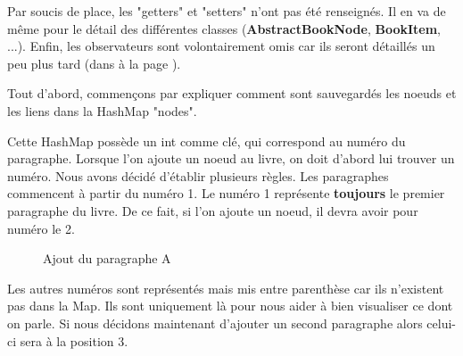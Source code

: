 			Par soucis de place, les "getters" et "setters" n'ont pas été renseignés. Il en va de même pour le détail des différentes classes (\textbf{AbstractBookNode}, \textbf{BookItem}, ...). Enfin, les observateurs sont volontairement omis car ils seront détaillés un peu plus tard (dans  à la page \pageref{subsec:pattern_observer}).

			Tout d'abord, commençons par expliquer comment sont sauvegardés les noeuds et les liens dans la HashMap "nodes".

			Cette HashMap possède un int comme clé, qui correspond au numéro du paragraphe. Lorsque l'on ajoute un noeud au livre, on doit d'abord lui trouver un numéro. Nous avons décidé d'établir plusieurs règles. Les paragraphes commencent à partir du numéro 1. Le numéro 1 représente \textbf{toujours} le premier paragraphe du livre. De ce fait, si l'on ajoute un noeud, il devra avoir pour numéro le 2.

			\begin{figure}[H]
				\begin{center}
				\end{center}
				\caption{Ajout du paragraphe A}
			\end{figure}

			Les autres numéros sont représentés mais mis entre parenthèse car ils n'existent pas dans la Map. Ils sont uniquement là pour nous aider à bien visualiser ce dont on parle. Si nous décidons maintenant d'ajouter un second paragraphe alors celui-ci sera à la position 3.

